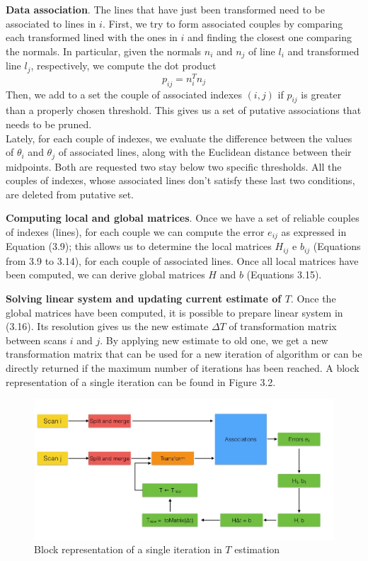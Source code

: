 \documentclass[a4paper, onecolumn]{report}
\begin{document}
\textbf{Data association}. The lines that have just been transformed need to be associated to lines in $i$. First, we try to form associated couples by comparing each transformed lined with the ones in $i$ and finding the closest one comparing the normals. In particular, given the normals $n_i$ and $n_j$ of line $l_i$ and transformed line $l_j$, respectively, we compute the dot product
\begin{equation}
	p_{ij} = n_i^Tn_j
\end{equation}
Then, we add to a set the couple of associated indexes $(i, j)$ if $p_{ij}$ is greater than a properly chosen threshold. This gives us a set of putative associations that needs to be pruned. \\
Lately, for each couple of indexes, we evaluate the difference between the values of $\theta_i$ and $\theta_j$ of associated lines, along with the Euclidean distance between their midpoints. Both are requested two stay below two specific thresholds. All the couples of indexes, whose associated lines don't satisfy these last two conditions, are deleted from putative set. 

\textbf{Computing local and global matrices}. Once we have a set of reliable couples of indexes (lines), for each couple we can compute the error $e_{ij}$ as expressed in Equation (3.9); this allows us to determine the local matrices $H_{ij}$ e $b_{ij}$ (Equations from 3.9 to 3.14), for each couple of associated lines. Once all local matrices have been computed, we can derive global matrices $H$ and $b$ (Equations 3.15).

\textbf{Solving linear system and updating current estimate of $T$}. Once the global matrices have been computed, it is possible to prepare linear system in (3.16). Its resolution gives us the new estimate $\Delta T$ of transformation matrix between scans $i$ and $j$.  By applying new estimate to old one, we get a new transformation matrix that can be used for a new iteration of algorithm or can be directly returned if the maximum number of iterations has been reached. A block representation of a single iteration can be found in Figure 3.2.

\begin{figure}[htbp]
\centering
\includegraphics[width=1\textwidth]{images/iterative_process.jpg}
\caption{Block representation of a single iteration in $T$ estimation}
\end{figure}
\end{document}
